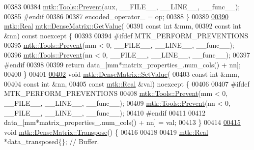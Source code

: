 \begin{DoxyCode}
00383 
00384   \hyperlink{classmtk_1_1Tools_a332324c6f25e66be9dff48c5987a3b9f}{mtk::Tools::Prevent}(aux, \_\_FILE\_\_, \_\_LINE\_\_, \_\_func\_\_);
00385 \textcolor{preprocessor}{  #endif}
00386 
00387   encoded\_operator\_ = op;
00388 \}
00389 
\hypertarget{mtk__dense__matrix_8cc_source_l00390}{}\hyperlink{classmtk_1_1DenseMatrix_a4b23ecbebd970b5eea915dbb50691024}{00390} \hyperlink{group__c01-roots_gac080bbbf5cbb5502c9f00405f894857d}{mtk::Real} \hyperlink{classmtk_1_1DenseMatrix_a4b23ecbebd970b5eea915dbb50691024}{mtk::DenseMatrix::GetValue}(
00391     \textcolor{keyword}{const} \textcolor{keywordtype}{int} &mm,
00392     \textcolor{keyword}{const} \textcolor{keywordtype}{int} &nn) \textcolor{keyword}{const} noexcept \{
00393 
00394 \textcolor{preprocessor}{  #ifdef MTK\_PERFORM\_PREVENTIONS}
00395   \hyperlink{classmtk_1_1Tools_a332324c6f25e66be9dff48c5987a3b9f}{mtk::Tools::Prevent}(mm < 0, \_\_FILE\_\_, \_\_LINE\_\_, \_\_func\_\_);
00396   \hyperlink{classmtk_1_1Tools_a332324c6f25e66be9dff48c5987a3b9f}{mtk::Tools::Prevent}(nn < 0, \_\_FILE\_\_, \_\_LINE\_\_, \_\_func\_\_);
00397 \textcolor{preprocessor}{  #endif}
00398 
00399   \textcolor{keywordflow}{return} data\_[mm*matrix\_properties\_.num\_cols() + nn];
00400 \}
00401 
\hypertarget{mtk__dense__matrix_8cc_source_l00402}{}\hyperlink{classmtk_1_1DenseMatrix_a784ce5784109ac86bfb9d8562b334b13}{00402} \textcolor{keywordtype}{void}  \hyperlink{classmtk_1_1DenseMatrix_a784ce5784109ac86bfb9d8562b334b13}{mtk::DenseMatrix::SetValue}(
00403     \textcolor{keyword}{const} \textcolor{keywordtype}{int} &mm,
00404     \textcolor{keyword}{const} \textcolor{keywordtype}{int} &nn,
00405     \textcolor{keyword}{const} \hyperlink{group__c01-roots_gac080bbbf5cbb5502c9f00405f894857d}{mtk::Real} &val) noexcept \{
00406 
00407 \textcolor{preprocessor}{  #ifdef MTK\_PERFORM\_PREVENTIONS}
00408   \hyperlink{classmtk_1_1Tools_a332324c6f25e66be9dff48c5987a3b9f}{mtk::Tools::Prevent}(mm < 0, \_\_FILE\_\_, \_\_LINE\_\_, \_\_func\_\_);
00409   \hyperlink{classmtk_1_1Tools_a332324c6f25e66be9dff48c5987a3b9f}{mtk::Tools::Prevent}(nn < 0, \_\_FILE\_\_, \_\_LINE\_\_, \_\_func\_\_);
00410 \textcolor{preprocessor}{  #endif}
00411 
00412   data\_[mm*matrix\_properties\_.num\_cols() + nn] = val;
00413 \}
00414 
\hypertarget{mtk__dense__matrix_8cc_source_l00415}{}\hyperlink{classmtk_1_1DenseMatrix_a71d9c07ca66e88d97d1fd5012f43138b}{00415} \textcolor{keywordtype}{void} \hyperlink{classmtk_1_1DenseMatrix_a71d9c07ca66e88d97d1fd5012f43138b}{mtk::DenseMatrix::Transpose}() \{
00416 
00418 
00419   \hyperlink{group__c01-roots_gac080bbbf5cbb5502c9f00405f894857d}{mtk::Real} *data\_transposed\{\}; \textcolor{comment}{// Buffer.}

\end{DoxyCode}
